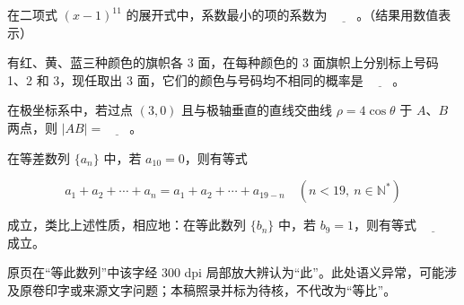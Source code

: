 \begin{question}
在二项式 $(x-1)^{11}$ 的展开式中，系数最小的项的系数为 $\underline{\qquad}$。（结果用数值表示）

\end{question}
\begin{question}
有红、黄、蓝三种颜色的旗帜各 3 面，在每种颜色的 3 面旗帜上分别标上号码 1、2 和 3，现任取出 3 面，它们的颜色与号码均不相同的概率是 $\underline{\qquad}$。

\end{question}
\begin{question}
在极坐标系中，若过点 $(3,0)$ 且与极轴垂直的直线交曲线 $\rho=4\cos\theta$ 于 $A\text{、}B$ 两点，则 $|AB|=\underline{\qquad}$。

\end{question}
\begin{question}
在等差数列 $\{a_n\}$ 中，若 $a_{10}=0$，则有等式

\nopagebreak[4]
\[
a_1+a_2+\cdots+a_n=a_1+a_2+\cdots+a_{19-n}\quad(n<19,\ n\in\mathbb{N}^{*})
\]

成立，类比上述性质，相应地：在等此数列 $\{b_n\}$ 中，若 $b_9=1$，则有等式 $\underline{\qquad}$ 成立。

\begin{gktip}
原页在“等此数列”中该字经 300 dpi 局部放大辨认为“此”。此处语义异常，可能涉及原卷印字或来源文字问题；本稿照录并标为待核，不代改为“等比”。
\end{gktip}

\end{question}

